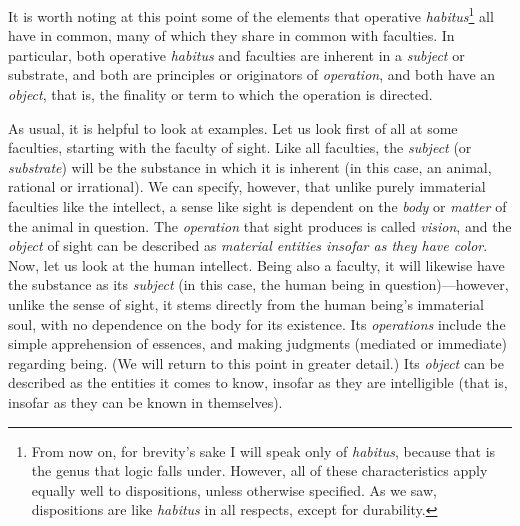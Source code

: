 \documentclass[article,12pt,a4paper,oneside]{memoir}
\begin{document}
    It is worth noting at this point some of the elements that operative
    \emph{habitus}\footnote{From now on, for brevity's sake I will speak
      only of \emph{habitus}, because that is the genus that logic falls
      under. However, all of these characteristics apply equally well to
      dispositions, unless otherwise specified. As we saw, dispositions
      are like \emph{habitus} in all respects, except for durability.}
    all have in common, many of which they share in common with
    faculties. In particular, both operative \emph{habitus} and
    faculties are inherent in a \emph{subject} or substrate, and both
    are principles or originators of \emph{operation}, and both have an
    \emph{object}, that is, the finality or term to which the operation
    is directed.

    As usual, it is helpful to look at examples. Let us look first of
    all at some faculties, starting with the faculty of sight. Like all
    faculties, the \emph{subject} (or \emph{substrate}) will be the
    substance in which it is inherent (in this case, an animal, rational
    or irrational). We can specify, however, that unlike purely
    immaterial faculties like the intellect, a sense like sight is
    dependent on the \emph{body} or \emph{matter} of the animal in
    question. The \emph{operation} that sight produces is called
    \emph{vision}, and the \emph{object} of sight can be described as
    \emph{material entities insofar as they have color}. Now, let us
    look at the human intellect. Being also a faculty, it will likewise
    have the substance as its \emph{subject} (in this case, the human
    being in question)---however, unlike the sense of sight, it stems
    directly from the human being's immaterial soul, with no dependence
    on the body for its existence. Its \emph{operations} include the
    simple apprehension of essences, and making judgments (mediated or
    immediate) regarding being. (We will return to this point in greater
    detail.) Its \emph{object} can be described as the entities it comes
    to know, insofar as they are intelligible (that is, insofar as they
    can be known in themselves).
\end{document}
